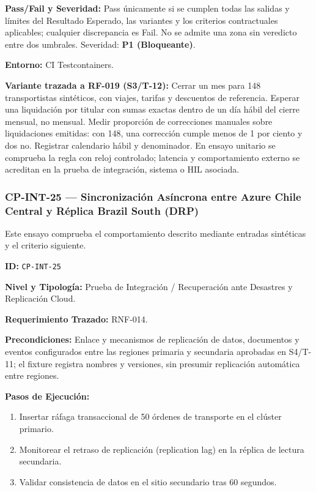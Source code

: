 \par\noindent\textbf{Pass/Fail y Severidad:} Pass únicamente si se cumplen todas las salidas y límites del Resultado Esperado, las variantes y los criterios contractuales aplicables; cualquier discrepancia es Fail. No se admite una zona sin veredicto entre dos umbrales. Severidad: \textbf{P1 (Bloqueante)}.\par
\par\noindent\textbf{Entorno:} CI Testcontainers.\par







\par\noindent\textbf{Variante trazada a RF-019 (S3/T-12):} Cerrar un mes para 148 transportistas sintéticos, con viajes, tarifas y descuentos de referencia. Esperar una liquidación por titular con sumas exactas dentro de un día hábil del cierre mensual, no mensual. Medir proporción de correcciones manuales sobre liquidaciones emitidas: con 148, una corrección cumple menos de 1 por ciento y dos no. Registrar calendario hábil y denominador. En ensayo unitario se comprueba la regla con reloj controlado; latencia y comportamiento externo se acreditan en la prueba de integración, sistema o HIL asociada.\par
\subsubsection*{CP-INT-25 — Sincronización Asíncrona entre Azure Chile Central y Réplica Brazil South (DRP)}\label{sec:9-cp-int-25}
Este ensayo comprueba el comportamiento descrito mediante entradas sintéticas y el criterio siguiente.

\par\noindent \textbf{ID:} \texttt{CP-\allowbreak{}INT-\allowbreak{}25}\par
\par\noindent \textbf{Nivel y Tipología:} Prueba de Integración / Recuperación ante Desastres y Replicación Cloud.\par
\par\noindent \textbf{Requerimiento Trazado:} RNF-014.\par
\par\noindent \textbf{Precondiciones:} Enlace y mecanismos de replicación de datos, documentos y eventos configurados entre las regiones primaria y secundaria aprobadas en S4/T-11; el fixture registra nombres y versiones, sin presumir replicación automática entre regiones.\par
\par\noindent \textbf{Pasos de Ejecución:}\par
\begin{enumerate}
\item Insertar ráfaga transaccional de 50 órdenes de transporte en el clúster primario.
\item Monitorear el retraso de replicación (replication lag) en la réplica de lectura secundaria.
\item Validar consistencia de datos en el sitio secundario tras 60 segundos.
\end{enumerate}

